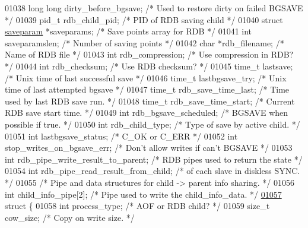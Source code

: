 \begin{DoxyCode}
{{{{{{{01038     \textcolor{keywordtype}{long} \textcolor{keywordtype}{long} dirty\_before\_bgsave;  \textcolor{comment}{/* Used to restore dirty on failed BGSAVE */}
01039     pid\_t rdb\_child\_pid;            \textcolor{comment}{/* PID of RDB saving child */}
01040     \textcolor{keyword}{struct} \hyperlink{structsaveparam}{saveparam} *saveparams;   \textcolor{comment}{/* Save points array for RDB */}
01041     \textcolor{keywordtype}{int} saveparamslen;              \textcolor{comment}{/* Number of saving points */}
01042     \textcolor{keywordtype}{char} *rdb\_filename;             \textcolor{comment}{/* Name of RDB file */}
01043     \textcolor{keywordtype}{int} rdb\_compression;            \textcolor{comment}{/* Use compression in RDB? */}
01044     \textcolor{keywordtype}{int} rdb\_checksum;               \textcolor{comment}{/* Use RDB checksum? */}
01045     time\_t lastsave;                \textcolor{comment}{/* Unix time of last successful save */}
01046     time\_t lastbgsave\_try;          \textcolor{comment}{/* Unix time of last attempted bgsave */}
01047     time\_t rdb\_save\_time\_last;      \textcolor{comment}{/* Time used by last RDB save run. */}
01048     time\_t rdb\_save\_time\_start;     \textcolor{comment}{/* Current RDB save start time. */}
01049     \textcolor{keywordtype}{int} rdb\_bgsave\_scheduled;       \textcolor{comment}{/* BGSAVE when possible if true. */}
01050     \textcolor{keywordtype}{int} rdb\_child\_type;             \textcolor{comment}{/* Type of save by active child. */}
01051     \textcolor{keywordtype}{int} lastbgsave\_status;          \textcolor{comment}{/* C\_OK or C\_ERR */}
01052     \textcolor{keywordtype}{int} stop\_writes\_on\_bgsave\_err;  \textcolor{comment}{/* Don't allow writes if can't BGSAVE */}
01053     \textcolor{keywordtype}{int} rdb\_pipe\_write\_result\_to\_parent; \textcolor{comment}{/* RDB pipes used to return the state */}
01054     \textcolor{keywordtype}{int} rdb\_pipe\_read\_result\_from\_child; \textcolor{comment}{/* of each slave in diskless SYNC. */}
01055     \textcolor{comment}{/* Pipe and data structures for child -> parent info sharing. */}
01056     \textcolor{keywordtype}{int} child\_info\_pipe[2];         \textcolor{comment}{/* Pipe used to write the child\_info\_data. */}
\hyperlink{structredisServer_8child__info__data}{01057}     \textcolor{keyword}{struct} \{
01058         \textcolor{keywordtype}{int} process\_type;           \textcolor{comment}{/* AOF or RDB child? */}
01059         size\_t cow\_size;            \textcolor{comment}{/* Copy on write size. */}
}}}}}}}
\end{DoxyCode}
